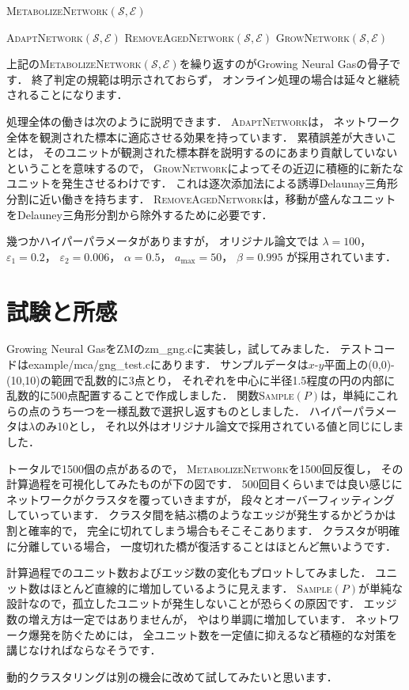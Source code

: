 ﻿\documentclass{jsarticle}
\begin{document}
\begin{algorithm}[tbh]
\caption{\textsc{MetabolizeNetwork}$(\mathcal{S},\mathcal{E})$}
\begin{algorithmic}[1]
  \State \textsc{AdaptNetwork}$(\mathcal{S},\mathcal{E})$
  \State \textsc{RemoveAgedNetwork}$(\mathcal{S},\mathcal{E})$
\EndFor
\State \textsc{GrowNetwork}$(\mathcal{S},\mathcal{E})$
\end{algorithmic}
\end{algorithm}

上記の\textsc{MetabolizeNetwork}$(\mathcal{S},\mathcal{E})$を繰り返すのがGrowing Neural Gasの骨子です．
終了判定の規範は明示されておらず，
オンライン処理の場合は延々と継続されることになります．

処理全体の働きは次のように説明できます．
\textsc{AdaptNetwork}は，
ネットワーク全体を観測された標本に適応させる効果を持っています．
累積誤差が大きいことは，
そのユニットが観測された標本群を説明するのにあまり貢献していないということを意味するので，
\textsc{GrowNetwork}によってその近辺に積極的に新たなユニットを発生させるわけです．
これは逐次添加法による誘導Delaunay三角形分割に近い働きを持ちます．
\textsc{RemoveAgedNetwork}は，移動が盛んなユニットをDelauney三角形分割から除外するために必要です．

幾つかハイパーパラメータがありますが，
オリジナル論文では
$\lambda=100$，
$\varepsilon_{1}=0.2$，
$\varepsilon_{2}=0.006$，
$\alpha=0.5$，
$a_{\mathrm{max}}=50$，
$\beta=0.995$
が採用されています．


\section{試験と所感}

Growing Neural GasをZMのzm\_gng.cに実装し，試してみました．
テストコードはexample/mca/gng\_test.cにあります．
サンプルデータは$x$-$y$平面上の(0,0)-(10,10)の範囲で乱数的に3点とり，
それぞれを中心に半径1.5程度の円の内部に乱数的に500点配置することで作成しました．
関数\textsc{Sample}$(P)$は，単純にこれらの点のうち一つを一様乱数で選択し返すものとしました．
ハイパーパラメータは$\lambda$のみ10とし，
それ以外はオリジナル論文で採用されている値と同じにしました．

トータルで1500個の点があるので，
\textsc{MetabolizeNetwork}を1500回反復し，
その計算過程を可視化してみたものが下の図です．
500回目くらいまでは良い感じにネットワークがクラスタを覆っていきますが，
段々とオーバーフィッティングしていっています．
クラスタ間を結ぶ橋のようなエッジが発生するかどうかは割と確率的で，
完全に切れてしまう場合もそこそこあります．
クラスタが明確に分離している場合，
一度切れた橋が復活することはほとんど無いようです．

計算過程でのユニット数およびエッジ数の変化もプロットしてみました．
ユニット数はほとんど直線的に増加しているように見えます．
\textsc{Sample}$(P)$が単純な設計なので，孤立したユニットが発生しないことが恐らくの原因です．
エッジ数の増え方は一定ではありませんが，
やはり単調に増加しています．
ネットワーク爆発を防ぐためには，
全ユニット数を一定値に抑えるなど積極的な対策を講じなければならなそうです．

動的クラスタリングは別の機会に改めて試してみたいと思います．
\end{document}
